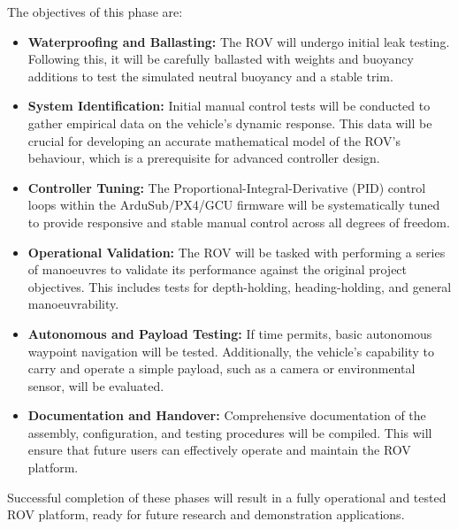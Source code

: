 \documentclass[11pt, a4paper]{article}
\begin{document}
The objectives of this phase are:
\begin{itemize}
    \item \textbf{Waterproofing and Ballasting:} The ROV will undergo initial leak testing. Following this, it will be carefully ballasted with weights and buoyancy additions to test the simulated neutral buoyancy and a stable trim.
    \item \textbf{System Identification:} Initial manual control tests will be conducted to gather empirical data on the vehicle's dynamic response. This data will be crucial for developing an accurate mathematical model of the ROV's behaviour, which is a prerequisite for advanced controller design.
    \item \textbf{Controller Tuning:} The Proportional-Integral-Derivative (PID) control loops within the ArduSub/PX4/GCU firmware will be systematically tuned to provide responsive and stable manual control across all degrees of freedom.
    \item \textbf{Operational Validation:} The ROV will be tasked with performing a series of manoeuvres to validate its performance against the original project objectives. This includes tests for depth-holding, heading-holding, and general manoeuvrability.
    \item \textbf{Autonomous and Payload Testing:} If time permits, basic autonomous waypoint navigation will be tested. Additionally, the vehicle's capability to carry and operate a simple payload, such as a camera or environmental sensor, will be evaluated.
    \item \textbf{Documentation and Handover:} Comprehensive documentation of the assembly, configuration, and testing procedures will be compiled. This will ensure that future users can effectively operate and maintain the ROV platform.
\end{itemize}
Successful completion of these phases will result in a fully operational and tested ROV platform, ready for future research and demonstration applications.




\appendix
\end{document}
